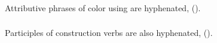 \subsubsection{} Attributive phrases of color using  
are hyphenated,   ().

\subsubsection{} Participles of  construction verbs are also
hyphenated,  
().

